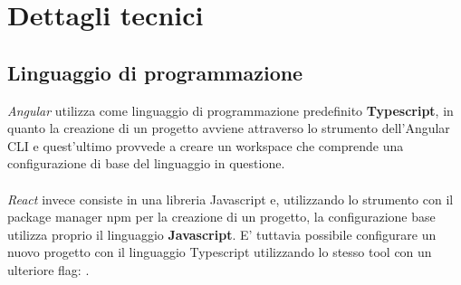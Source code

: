 
\section{Dettagli tecnici}

\subsection{Linguaggio di programmazione}
\label{sec:linguaggio-programmazione}
\textit{Angular} utilizza come linguaggio di programmazione predefinito \textbf{Typescript}, in quanto la creazione di un progetto avviene attraverso lo strumento dell'Angular CLI   e quest'ultimo provvede a creare un workspace che comprende una configurazione di base del linguaggio in questione. \\ \\
\textit{React} invece consiste in una libreria Javascript e, utilizzando lo strumento  con il package manager npm  per la creazione di un progetto, la configurazione base utilizza proprio il linguaggio \textbf{Javascript}. E' tuttavia possibile configurare un nuovo progetto con il linguaggio Typescript utilizzando lo stesso tool con un ulteriore flag: .

